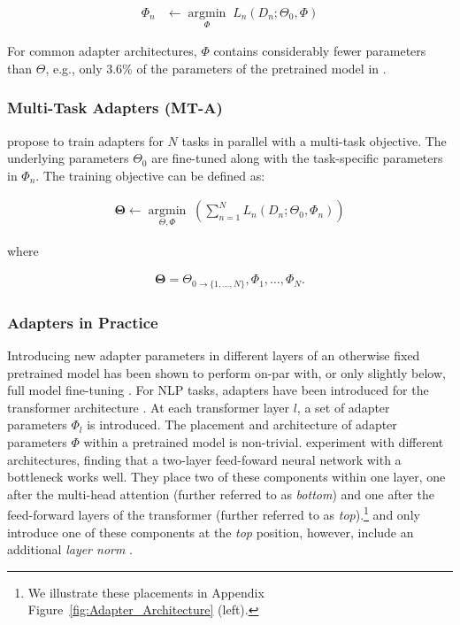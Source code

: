\begin{align*}
    \Phi_n &\leftarrow \underset{\Phi}{\operatorname{argmin}}\;L_n(D_n;\Theta_0,\Phi)
\end{align*}

For common adapter architectures, $\Phi$ contains considerably fewer parameters than $\Theta$, e.g., only 3.6\% of the parameters of the pretrained model in \citet{houlsby2019parameter}.

\subsubsection{Multi-Task Adapters (MT-A)} 
\citet{stickland2019bert} propose to train adapters for $N$ tasks in parallel with a multi-task objective. The underlying parameters
$\Theta_0$
are fine-tuned along with the task-specific parameters in $\Phi_n$.
The training objective can be defined as:

\begin{equation*}
\begin{split}
     \mathbf{\Theta} \leftarrow 
    \underset{\Theta, \Phi}{\operatorname{argmin}}\; \left( \sum_{n=1}^N L_n(D_n;\Theta_0,\Phi_n)\right)
\end{split}
\end{equation*}

where

\begin{gather*}
    \mathbf{\Theta} =  \Theta_{0 \rightarrow \{1, ..., N\}},  
    \Phi_1, \dots, \Phi_N.
\end{gather*}

\subsubsection{Adapters in Practice}
\label{sec:adapterinpractice}
Introducing new adapter parameters in different layers of an otherwise fixed pretrained model has been shown to perform on-par with, or only slightly below, full model fine-tuning 
\cite{houlsby2019parameter, stickland2019bert, pfeiffer2020AdapterHub}. For NLP tasks, adapters have been introduced for the transformer architecture \cite{Vaswani17}. At each transformer layer $l$, a set of adapter parameters $\Phi_l$ is introduced. The placement and architecture of adapter parameters $\Phi$ within a pretrained model is non-trivial.  \citet{houlsby2019parameter} experiment with different architectures, finding that a two-layer feed-foward neural network with a bottleneck works well. They place two of these components within one layer, one after the multi-head attention (further referred to as \textit{bottom}) and one after the feed-forward layers of the transformer (further referred to as \textit{top}).\footnote{ We illustrate these placements in Appendix Figure~\ref{fig:Adapter_Architecture} (left).}
\citet{bapna2019simple} and \citet{stickland2019bert} only introduce one of these components at the \textit{top} position, however, \citet{bapna2019simple}  include an additional \textit{layer norm} \cite{Ba16_LayerNorm}. 


